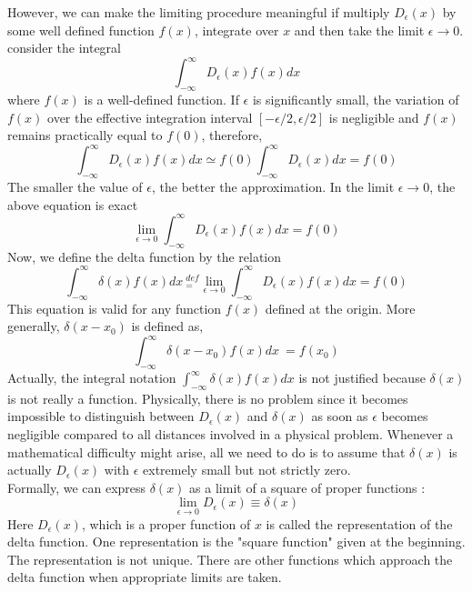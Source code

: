 	However, we can make the limiting procedure meaningful if multiply $D_\epsilon(x)$ by some well defined function $f(x)$, integrate over $x$ and then take the limit $\epsilon \rightarrow 0 $. consider the integral
	\begin{equation}
		\int_{-\infty}^{\infty} D_\epsilon(x) f(x) dx
	\end{equation}
	where $f(x)$ is a well-defined function. If $\epsilon$ is significantly small, the variation of $f(x)$ over the effective integration interval $[-\epsilon / 2, \epsilon / 2]$ is negligible and $f(x)$ remains practically equal to $f(0)$, therefore,
	\begin{equation}
		\int_{-\infty}^{\infty} D_\epsilon (x) f(x) dx \simeq f(0) \int_{-\infty}^{\infty} D_\epsilon (x) dx = f(0)
	\end{equation}
	The smaller the value of $\epsilon$, the better the approximation. In the limit $\epsilon \rightarrow 0$, the above equation is exact
	\begin{equation}
		\lim\limits_{\epsilon \rightarrow 0}\int_{-\infty}^{\infty} D_\epsilon (x) f(x) dx  = f(0)
	\end{equation}
	Now, we define the delta function by the relation
	\begin{equation}
		\int_{-\infty}^{\infty} \delta(x) f(x) dx \  _=^{def}  \lim\limits_{\epsilon \rightarrow 0}\int_{-\infty}^{\infty} D_\epsilon (x) f(x) dx  = f(0)
	\end{equation}
	This equation is valid for any function $f(x)$ defined at the origin. More generally, $\delta(x - x_0)$ is defined as,
	\begin{equation}
		\int_{-\infty}^{\infty} \delta(x - x_0) f(x) dx \ = f(x_0)
	\end{equation}
	Actually, the integral notation $\int_{-\infty}^{\infty} \delta(x) f(x) dx$ is not justified because $\delta(x)$ is not really a function. Physically, there is no problem since it becomes impossible to distinguish between $D_\epsilon(x)$ and $\delta(x)$ as soon as $\epsilon$ becomes negligible compared to all distances involved in a physical problem. Whenever a mathematical difficulty might arise, all we need to do is to assume that $\delta(x)$ is actually $D_\epsilon(x)$ with $\epsilon$ extremely small but not strictly zero.
	\\
	Formally, we can express $\delta(x)$ as a limit of a square of proper functions : 
	\begin{equation}
		\lim\limits_{\epsilon \rightarrow 0} D_\epsilon(x) \equiv \delta(x)
	\end{equation}
	Here $D_\epsilon(x)$, which is a proper function of $x$ is called the representation of the delta function. One representation is the "square function" given at the beginning. The representation is not unique. There are other functions which approach the delta function when appropriate limits are taken.
	
